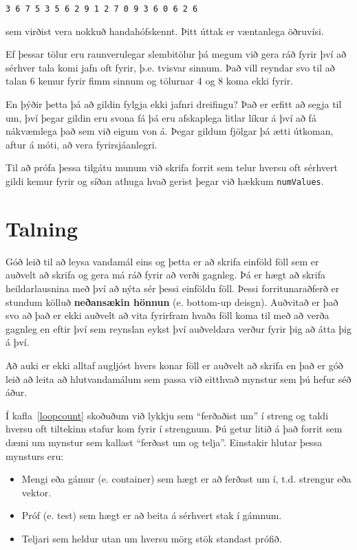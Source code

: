 \begin{verbatim}
3 6 7 5 3 5 6 2 9 1 2 7 0 9 3 6 0 6 2 6 
\end{verbatim}
%
sem virðist vera nokkuð handahófskennt.  Þitt úttak er væntanlega öðruvísi.

Ef þessar tölur eru raunverulegar slembitölur þá megum við gera ráð fyrir því að sérhver tala komi jafn oft fyrir, þ.e. tvisvar sinnum.
Það vill reyndar svo til að talan 6 kemur fyrir fimm sinnum og tölurnar 4 og 8 koma ekki fyrir.

En þýðir þetta þá að gildin fylgja ekki jafnri dreifingu?
Það er erfitt að segja til um, því þegar gildin eru svona fá þá eru afskaplega litlar líkur á því að fá nákvæmlega það sem við eigum von á.
Þegar gildum fjölgar þá ætti útkoman, aftur á móti, að vera fyrirsjáanlegri.

Til að prófa þessa tilgátu munum við skrifa forrit sem telur hversu oft sérhvert gildi kemur fyrir og síðan athuga hvað gerist
þegar við hækkum {\tt numValues}.

\section{Talning}
\label{counting}

Góð leið til að leysa vandamál eins og þetta er að skrifa einföld föll sem er auðvelt að skrifa og gera má ráð fyrir að verði gagnleg.
Þá er hægt að skrifa heildarlausnina með því að nýta sér þessi einföldu föll.
Þessi forritunaraðferð er stundum kölluð {\bf neðansækin hönnun} (e. bottom-up deisgn).
Auðvitað er það svo að það er ekki auðvelt að vita fyrirfram hvaða föll koma til með að verða gagnleg
en eftir því sem reynslan eykst því auðveldara verður fyrir þig að átta þig á því.


Að auki er ekki alltaf augljóst hvers konar föll er auðvelt að skrifa en 
það er góð leið að leita að hlutvandamálum sem passa við eitthvað mynstur sem þú hefur séð áður.


Í kafla~\ref{loopcount} skoðuðum við lykkju sem ``ferðaðist um'' í streng og taldi hversu oft tiltekinn stafur kom fyrir í strengnum.
Þú getur litið á það forrit sem dæmi um mynstur sem kallast ``ferðast um og telja''.
Einstakir hlutar þessa mynsturs eru:

\begin{itemize}

\item Mengi eða gámur (e. container) sem hægt er að ferðast um í, t.d. strengur eða vektor. 

\item Próf (e. test) sem hægt er að beita á sérhvert stak í gámnum.

\item Teljari sem heldur utan um hversu mörg stök standast prófið. 

\end{itemize}

